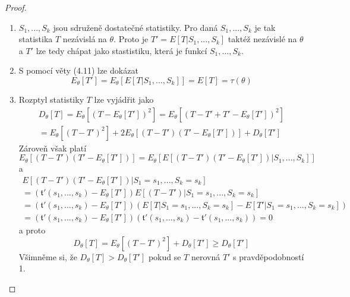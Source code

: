 \begin{proof}
~
\begin{enumerate}
\item $S_1, ..., S_k$ jsou sdruženě dostatečné statistiky. Pro daná $S_1, ..., S_k$ je tak statistika $T$ nezávislá na $\theta$. Proto je $T' = E[T|S_1, ..., S_k]$ taktéž nezávislé na $\theta$ a $T'$ lze tedy chápat jako stastistiku, která je funkcí $S_1, ..., S_k$.
\item S pomocí věty (4.11) lze dokázat
\begin{equation*}
E_{\theta}[T'] = E_{\theta}[E[T|S_1, ..., S_k]] = E[T] = \tau(\theta)
\end{equation*}
\item Rozptyl statistiky $T$ lze vyjádřit jako
\begin{gather*}
D_{\theta}[T] = E_{\theta}[(T - E_{\theta}[T'])^2] = E_{\theta}[(T - T' + T' - E_{\theta}[T'])^2]\\
= E_{\theta}[(T - T')^2] + 2 E_{\theta}[(T - T')(T' - E_{\theta}[T'])] + D_{\theta}[T']
\end{gather*}
Zároveň však platí
\begin{equation*}
E_{\theta}[(T - T')(T' - E_{\theta}[T'])] = E_{\theta}[E[(T - T')(T' - E_{\theta}[T'])|S_1, ..., S_k]]
\end{equation*}
a
\begin{gather*}
E[(T - T')(T' - E_{\theta}[T'])|S_1 = s_1, ..., S_k = s_k]\\
= \left(\mathfrak{t}'(s_1, ..., s_k) - E_{\theta}[T']\right)E[(T - T')|S_1 = s_1, ..., S_k = s_k]\\
= \left(\mathfrak{t}'(s_1, ..., s_k) - E_{\theta}[T']\right)\left(E[T|S_1 = s_1, ..., S_k = s_k] - E[T'|S_1 = s_1, ..., S_k = s_k]\right)\\
= \left(\mathfrak{t}'(s_1, ..., s_k) - E_{\theta}[T']\right)\left(\mathfrak{t}'(s_1, ..., s_k) - \mathfrak{t}'(s_1, ..., s_k)\right) = 0
\end{gather*}
a proto
\begin{equation*}
D_{\theta}[T] = E_{\theta}[(T - T')^2] + D_{\theta}[T'] \ge D_{\theta}[T']
\end{equation*}
Všimněme si, že $D_{\theta}[T] > D_{\theta}[T']$ pokud se $T$ nerovná $T'$ s pravděpodobností 1.
\end{enumerate}
\end{proof}

